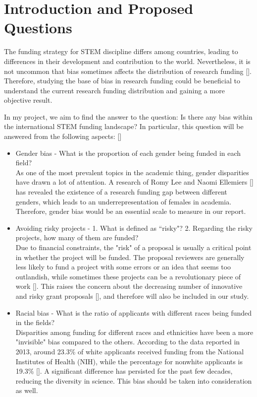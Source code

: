 \documentclass[11pt, oneside]{article}   	%
\begin{document}
\section{Introduction and Proposed Questions}

The funding strategy for STEM discipline differs among countries, leading to differences in their development and contribution to the world. Nevertheless, it is not uncommon that bias sometimes affects the distribution of research funding [\cite{crudden2022gender}]. Therefore, studying the base of bias in research funding could be beneficial to understand the current research funding distribution and gaining a more objective result.

\bigbreak
\noindent In my project, we aim to find the answer to the question: Is there any bias within the international STEM funding landscape? In particular, this question will be answered from the following aspects: [\cite{wojick2015government}]

\begin{itemize}
\item Gender bias - What is the proportion of each gender being funded in each field?
\\As one of the most prevalent topics in the academic thing, gender disparities have drawn a lot of attention. A research of Romy Lee and Naomi Ellemiers [\cite{van2015gender}] has revealed the existence of a research funding gap between different genders, which leads to an underrepresentation of females in academia. Therefore, gender bias would be an essential scale to measure in our report.
\item Avoiding risky projects - 1. What is defined as ``risky"? 2. Regarding the risky projects, how many of them are funded?
\\Due to financial constraints, the "risk" of a proposal is usually a critical point in whether the project will be funded. The proposal reviewers are generally less likely to fund a project with some errors or an idea that seems too outlandish, while sometimes these projects can be a revolutionary piece of work [\cite{franzoni2022funding}]. This raises the concern about the decreasing number of innovative and risky grant proposals [\cite{severin2021research}], and therefore will also be included in our study.
\item Racial bias - What is the ratio of applicants with different races being funded in the fields?
\\Disparities among funding for different races and ethnicities have been a more "invisible" bias compared to the others. According to the data reported in 2013, around 23.3\% of white applicants received funding from the National Institutes of Health (NIH), while the percentage for nonwhite applicants is 19.3\% [\cite{konkel2015racial}]. A significant difference has persisted for the past few decades, reducing the diversity in science. This bias should be taken into consideration as well.
\end{itemize}
\end{document}
